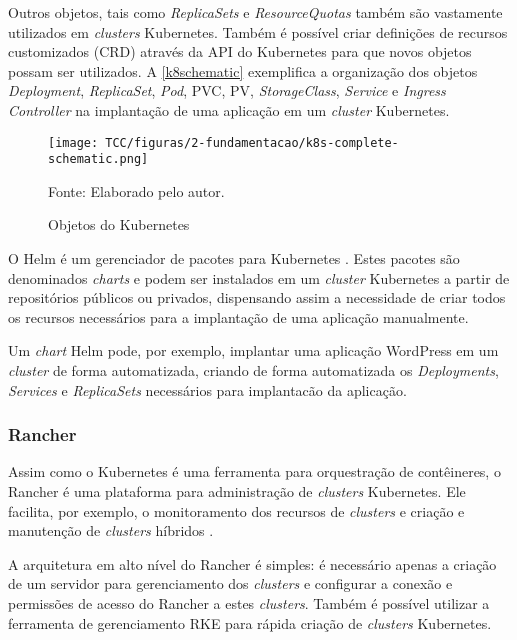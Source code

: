 Outros objetos, tais como \textit{ReplicaSets} e \textit{ResourceQuotas} também são vastamente utilizados em \textit{clusters} Kubernetes. Também é possível criar definições de recursos customizados (\ac{CRD}) através da \ac{API} do Kubernetes para que novos objetos possam ser utilizados. A \autoref{k8schematic} exemplifica a organização dos objetos \textit{Deployment}, \textit{ReplicaSet}, \textit{Pod}, \ac{PVC}, \ac{PV}, \textit{StorageClass}, \textit{Service} e \textit{Ingress Controller} na implantação de uma aplicação em um \textit{cluster} Kubernetes.

\begin{figure}[!htpb]
	\centering
	\caption{Objetos do Kubernetes}
    \texttt{[image: TCC/figuras/2-fundamentacao/k8s-complete-schematic.png]}
    
	Fonte: Elaborado pelo autor.
 	\label{k8schematic}
\end{figure}


O Helm é um gerenciador de pacotes para Kubernetes \cite{abouthelm}. Estes pacotes são denominados \textit{charts} e podem ser instalados em um \textit{cluster} Kubernetes a partir de repositórios públicos ou privados, dispensando assim a necessidade de criar todos os recursos necessários para a implantação de uma aplicação manualmente.

Um \textit{chart} Helm pode, por exemplo, implantar uma aplicação WordPress em um \textit{cluster} de forma automatizada, criando de forma automatizada os \textit{Deployments}, \textit{Services} e \textit{ReplicaSets} necessários para implantacão da aplicação.

\subsubsection{Rancher}

Assim como o Kubernetes é uma ferramenta para orquestração de contêineres, o Rancher é uma plataforma para administração de \textit{clusters} Kubernetes. Ele facilita, por exemplo, o monitoramento dos recursos de \textit{clusters} e criação e manutenção de \textit{clusters} híbridos \cite{rancherOverview}.

A arquitetura em alto nível do Rancher é simples: é necessário apenas a criação de um servidor para gerenciamento dos \textit{clusters} e configurar a conexão e permissões de acesso do Rancher a estes \textit{clusters}. Também é possível utilizar a ferramenta de gerenciamento \ac{RKE} para rápida criação de \textit{clusters} Kubernetes.

